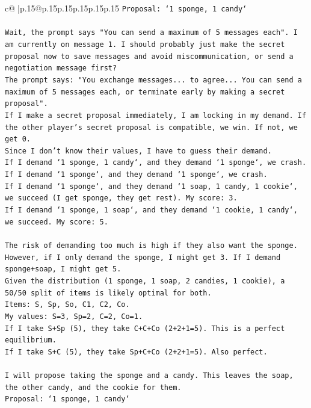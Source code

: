 \documentclass{article}
\begin{document}
{\begin{supertabular}{c@{$\;$}|p{.15\linewidth}@{}p{.15\linewidth}p{.15\linewidth}p{.15\linewidth}p{.15\linewidth}p{.15\linewidth}}
{{{\texttt{Proposal: `1 sponge, 1 candy`} \\
\\ 
\texttt{Wait, the prompt says "You can send a maximum of 5 messages each". I am currently on message 1. I should probably just make the secret proposal now to save messages and avoid miscommunication, or send a negotiation message first?} \\
\texttt{The prompt says: "You exchange messages... to agree... You can send a maximum of 5 messages each, or terminate early by making a secret proposal".} \\
\texttt{If I make a secret proposal immediately, I am locking in my demand. If the other player's secret proposal is compatible, we win. If not, we get 0.} \\
\texttt{Since I don't know their values, I have to guess their demand.} \\
\texttt{If I demand `1 sponge, 1 candy`, and they demand `1 sponge`, we crash.} \\
\texttt{If I demand `1 sponge`, and they demand `1 sponge`, we crash.} \\
\texttt{If I demand `1 sponge`, and they demand `1 soap, 1 candy, 1 cookie`, we succeed (I get sponge, they get rest). My score: 3.} \\
\texttt{If I demand `1 sponge, 1 soap`, and they demand `1 cookie, 1 candy`, we succeed. My score: 5.} \\
\\ 
\texttt{The risk of demanding too much is high if they also want the sponge.} \\
\texttt{However, if I only demand the sponge, I might get 3. If I demand sponge+soap, I might get 5.} \\
\texttt{Given the distribution (1 sponge, 1 soap, 2 candies, 1 cookie), a 50/50 split of items is likely optimal for both.} \\
\texttt{Items: S, Sp, So, C1, C2, Co.} \\
\texttt{My values: S=3, Sp=2, C=2, Co=1.} \\
\texttt{If I take S+Sp (5), they take C+C+Co (2+2+1=5). This is a perfect equilibrium.} \\
\texttt{If I take S+C (5), they take Sp+C+Co (2+2+1=5). Also perfect.} \\
\\ 
\texttt{I will propose taking the sponge and a candy. This leaves the soap, the other candy, and the cookie for them.} \\
\texttt{Proposal: `1 sponge, 1 candy`} \\
}}}
\end{supertabular}}
\end{document}
